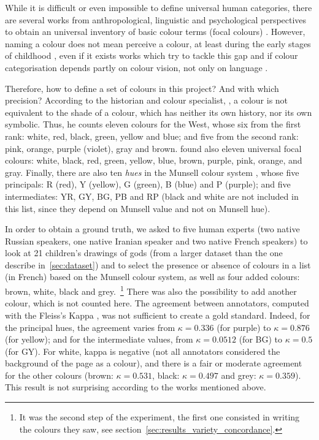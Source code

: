 \documentclass[11pt,a4paper]{article}
\begin{document}
While it is difficult or even impossible to define universal human
categories, there are several works from anthropological, linguistic and psychological perspectives to obtain an universal inventory of basic colour terms (focal colours) \cite[see e.g.]{berlinkay1969,RegierKayCook2005}. However, naming a colour does not mean perceive a colour, at least during the early stages of childhood \cite[see \textit{e.g.}][]{FranklinCliffordWilliamsonEtAl2005}, even if it exists works which try to tackle this gap \cite[see \textit{e.g.}][]{parragaakbarinia2016} and if colour categorisation depends partly on colour vision, not only on language \cite{SkeltonCatchpoleAbbottEtAl2017}.

Therefore, how to define a set of colours in this project? And with which precision? According to the historian and colour specialist,
\citet[][pp. 12, 63 and 183]{pastoureau2017}, a colour is not equivalent to the shade of a colour, which
has neither its own history, nor its own symbolic. Thus, he counts eleven colours for
the West, whose six from the first rank: white, red, black, green, yellow and blue; and five from the second rank: pink, orange, purple (violet), gray and brown. \citet{berlinkay1969} found also eleven universal focal colours: white, black, red, green, yellow, blue, brown, purple, pink, orange, and gray. Finally, there are also ten \textit{hues} in the Munsell colour system \cite{Munsell1912}, whose five principals: R (red), Y (yellow), G (green), B (blue) and P (purple); and five intermediates: YR, GY, BG, PB and RP (black and white are not included in this list, since they depend on Munsell value and not on Munsell hue).

In order to obtain a ground truth, we asked to five human experts (two native Russian speakers, one native Iranian speaker and two native French speakers) to look at 21 children's drawings of gods (from a larger dataset than the one describe in~\ref{sec:dataset}) and to select the presence or absence of colours in a list (in French) based on the Munsell colour system, as well as four added colours: brown, white, black and grey.~\footnote{It was the second step of the experiment, the first one consisted in writing the colours they saw, see section~\ref{sec:results_variety_concordance}.} There was also the possibility to add another colour, which is not counted here. The agreement between annotators, computed with the Fleiss's Kappa \cite{Fleiss1971}, was not sufficient to create a gold standard. Indeed, for the principal hues, the agreement varies from $\kappa = 0.336$ (for purple) to $\kappa = 0.876$ (for yellow); and for the intermediate values, from $\kappa = 0.0512$ (for BG) to $\kappa = 0.5$ (for GY). For white, kappa is negative (not all annotators considered the background of the page as a colour), and there is a fair or moderate agreement for the other colours (brown: $\kappa = 0.531$, black: $\kappa = 0.497$ and grey: $\kappa = 0.359$). This result is not surprising according to the works mentioned above.
\end{document}
